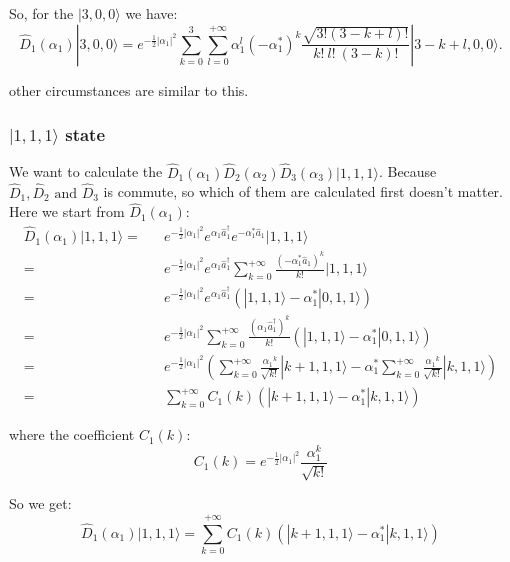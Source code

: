 \documentclass[%
 reprint,
 amsmath,amssymb,
 aps,
onecolumn
]{revtex4-2}
\begin{document}
So, for the $|3,0,0\rangle$ we have:
\begin{equation}
  \hat{D}_1(\alpha_1) |3,0,0\rangle =
  e^{-\frac{1}{2}|\alpha_1|^2} \sum_{k=0}^{3} \sum_{l=0}^{+\infty}
  \alpha_1^l {(-\alpha_1^*)}^k \frac{\sqrt{3!(3-k+l)!}}{k!~l!~(3-k)!}
  |3-k+l,0,0\rangle .
\end{equation}

other circumstances are similar to this.

\subsubsection{ $|1,1,1\rangle$ state}
We want to calculate the 
$ \hat{D}_1(\alpha_1)\hat{D}_2(\alpha_2)\hat{D}_3(\alpha_3) |1,1,1\rangle$.
Because $\hat{D}_1, \hat{D}_2 \text{~and~} \hat{D}_3$ is commute,
so which of them are calculated first doesn't matter.
Here we start from $\hat{D}_1(\alpha_1)$:
\begin{eqnarray}
  \hat{D}_1(\alpha_1) |1,1,1\rangle =&&
  e^{-\frac{1}{2}|\alpha_1|^2}e^{\alpha_1\hat{a}_1^\dagger}
  e^{-\alpha_1^*\hat{a}_1} |1,1,1\rangle 
  \nonumber \\ =&&
  e^{-\frac{1}{2}|\alpha_1|^2}e^{\alpha_1\hat{a}_1^\dagger}
  \sum_{k=0}^{+\infty}\frac{{(-\alpha_1^*\hat{a}_1)}^k}{k!}
  |1,1,1\rangle 
  \nonumber \\ =&&
  e^{-\frac{1}{2}|\alpha_1|^2}e^{\alpha_1\hat{a}_1^\dagger}
  \left( |1,1,1\rangle - \alpha_1^*|0,1,1\rangle \right) 
  \nonumber \\ =&&
  e^{-\frac{1}{2}|\alpha_1|^2} 
  \sum_{k=0}^{+\infty}\frac{{(\alpha_1\hat{a}_1^\dagger)}^k}{k!}
  \left( |1,1,1\rangle - \alpha_1^*|0,1,1\rangle \right) 
  \nonumber \\ =&&
  e^{-\frac{1}{2}|\alpha_1|^2} 
  \left(
    \sum_{k=0}^{+\infty}\frac{{\alpha_1}^k}{\sqrt{k!}} |k+1,1,1\rangle - \alpha_1^*
    \sum_{k=0}^{+\infty}\frac{{\alpha_1}^k}{\sqrt{k!}} |k,1,1\rangle
  \right) 
  \label{D1|111} \\ =&&
  \sum_{k=0}^{+\infty} C_1(k) 
  \left( |k+1,1,1\rangle -\alpha_1^*|k,1,1\rangle \right) 
\end{eqnarray}

where the coefficient $C_1(k)$:
\begin{equation}
  C_1(k) = e^{-\frac{1}{2}{|\alpha_1|}^2} \frac{\alpha_1^k}{\sqrt{k!}}  \label{C1(k)}
\end{equation}

So we get:
\begin{equation}
  \hat{D}_1(\alpha_1) |1,1,1\rangle = \sum_{k=0}^{+\infty} C_1(k) 
  \left( |k+1,1,1\rangle -\alpha_1^*|k,1,1\rangle \right)
\end{equation}
\end{document}
